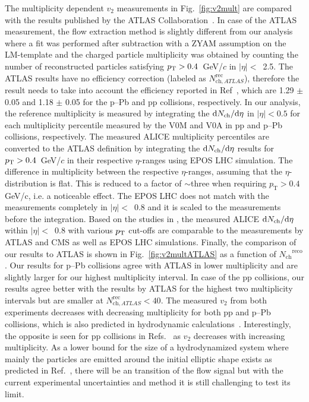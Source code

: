 The multiplicity dependent $v_2$ measurements in Fig.~\ref{fig:v2mult} are compared with the results published by the ATLAS Collaboration~\cite{Aaboud:2016yar}. In case of the ATLAS measurement, the flow extraction method is slightly different from our analysis where a fit was performed after subtraction with a ZYAM assumption on the LM-template and the charged particle multiplicity was obtained by counting the number of reconstructed particles satisfying $p_\mathrm{T}>0.4$~GeV/$c$ in $|\eta|<$~2.5. The ATLAS results have no efficiency correction (labeled as ${N^\mathrm{rec}_{\mathrm{ch},ATLAS}}$), therefore the result needs to take into account the efficiency reported in Ref~\cite{ATLAS:2016yzd}, which are 1.29 $\pm$ 0.05 and 1.18 $\pm$ 0.05 for the p--Pb and pp collisions, respectively. In our analysis, the reference multiplicity is measured by integrating the ${\rm d}N_{\rm ch}/{\rm d}\eta$ in $|\eta|<0.5$ for each multiplicity percentile measured by the V0M and V0A in pp and p--Pb collisions, respectively. 
The measured ALICE multiplicity percentiles are converted to the ATLAS definition by integrating the ${\rm d}N_{\rm ch}/{\rm d}\eta$ results for $p_\mathrm{T}>0.4$~GeV/$c$ in their respective $\eta$-ranges using EPOS LHC simulation. 
The difference in multiplicity between the respective $\eta$-ranges, assuming that the $\eta$-distribution is flat. This is reduced to a factor of $\sim$three when requiring $p_\mathrm{T}>0.4$ GeV/c, i.e. a noticeable effect.
The EPOS LHC does not match with the measurements completely in $|\eta|<$~0.8 and it is scaled to the measurements before the integration. Based on the studies in \cite{ALICE:Nchpt}, the measured ALICE ${\rm d}N_{\rm ch}/{\rm d}\eta$ within $|\eta|<$~0.8 with various $p_\mathrm{T}$ cut-offs are comparable to the measurements by ATLAS and CMS as well as EPOS LHC simulations. Finally, the comparison of our results to ATLAS is shown in Fig.~\ref{fig:v2multATLAS} as a function of ${N_\mathrm{ch}}^\mathrm{reco}$.  
Our results for p--Pb collisions agree with ATLAS in lower multiplicity and are slightly larger for our highest multiplicity interval. In case of  the pp collisions, our results agree better with the results by ATLAS for the highest two multiplicity intervals but are smaller at ${N^\mathrm{rec}_{\mathrm{ch},ATLAS}}<40$. The measured $v_{2}$ from both experiments decreases with decreasing multiplicity for both pp and p--Pb collisions, which is also predicted in hydrodynamic calculations~\cite{Weller:2017tsr,Taghavi:2019mqz}. Interestingly, the opposite is seen for pp collisions in Refs.~\cite{Schenke:2020mbo} as $v_2$ decreases with increasing
multiplicity. 
As a lower bound for the size of a hydrodynamized
system where mainly the particles are emitted around the initial elliptic shape exists as predicted in Ref.~\cite{Taghavi:2019mqz}, there will be an transition of the flow signal but with the current experimental uncertainties and method it is still challenging to test its limit.


